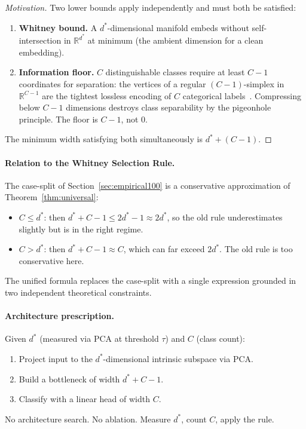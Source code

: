 \documentclass[11pt,letterpaper]{article}
\begin{document}
\begin{proof}[Motivation]
Two lower bounds apply independently and must both be satisfied:
\begin{enumerate}
  \item \textbf{Whitney bound.}  A $d^*$-dimensional manifold embeds
    without self-intersection in $\mathbb{R}^{d^*}$ at minimum (the
    ambient dimension for a clean embedding).
  \item \textbf{Information floor.}  $C$ distinguishable classes require
    at least $C-1$ coordinates for separation: the vertices of a regular
    $(C-1)$-simplex in $\mathbb{R}^{C-1}$ are the tightest lossless
    encoding of $C$ categorical labels~\cite{simplex_embedding}.
    Compressing below $C - 1$ dimensions destroys class separability
    by the pigeonhole principle.  The floor is $C-1$, not $0$.
\end{enumerate}
The minimum width satisfying both simultaneously is $d^* + (C - 1)$.
\end{proof}

\paragraph{Relation to the Whitney Selection Rule.}
The case-split of Section~\ref{sec:empirical100} is a conservative
approximation of Theorem~\ref{thm:universal}:
\begin{itemize}[nosep]
  \item $C \leq d^*$: then $d^* + C - 1 \leq 2d^* - 1 \approx 2d^*$, so
    the old rule underestimates slightly but is in the right regime.
  \item $C > d^*$: then $d^* + C - 1 \approx C$, which can far exceed
    $2d^*$.  The old rule is too conservative here.
\end{itemize}
The unified formula replaces the case-split with a single expression
grounded in two independent theoretical constraints.

\paragraph{Architecture prescription.}
Given $d^*$ (measured via PCA at threshold $\tau$) and $C$ (class count):
\begin{enumerate}[nosep]
  \item Project input to the $d^*$-dimensional intrinsic subspace via PCA.
  \item Build a bottleneck of width $d^* + C - 1$.
  \item Classify with a linear head of width $C$.
\end{enumerate}
No architecture search.  No ablation.  Measure $d^*$, count $C$,
apply the rule.
\end{document}
